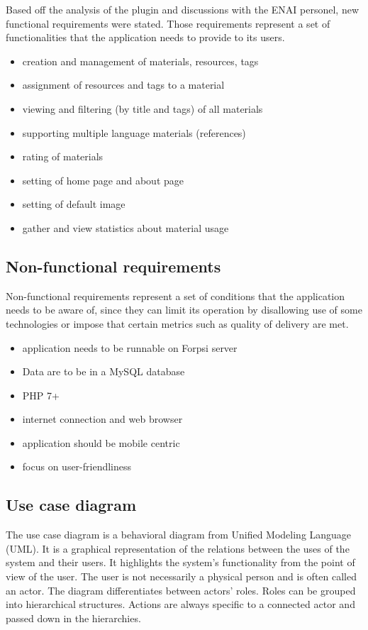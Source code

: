 \documentclass[
  digital,     %
  oneside,     %
  nosansbold,  %
  colorbold, %
  lof,         %
  lot,         %
]{fithesis4}
\begin{document}
Based off the analysis of the plugin and discussions with the ENAI personel, new functional requirements were stated. Those requirements represent a set of functionalities that the application needs to provide to its users.

\begin{itemize}
    \item creation and management of materials, resources, tags
    \item assignment of resources and tags to a material
    \item viewing and filtering (by title and tags) of all materials
    \item supporting multiple language materials (references)
    \item rating of materials
    \item setting of home page and about page
    \item setting of default image
    \item gather and view statistics about material usage
\end{itemize}

\subsection{Non-functional requirements}

Non-functional requirements represent a set of conditions that the application needs to be aware of, since they can limit its operation by disallowing use of some technologies or impose that certain metrics such as quality of delivery are met.

\begin{itemize}
	\item application needs to be runnable on Forpsi server~\cite{forpsi}
	\item Data are to be in a MySQL database
	\item PHP 7+
	\item internet connection and web browser
	\item application should be mobile centric
	\item focus on user-friendliness
\end{itemize}

\subsection{Use case diagram}

The use case diagram is a behavioral diagram from Unified Modeling Language (UML). It is a graphical representation of the relations between the uses of the system and their users. It highlights the system's functionality from the point of view of the user. The user is not necessarily a physical person and is often called an actor. The diagram differentiates between actors' roles. Roles can be grouped into hierarchical structures. Actions are always specific to a connected actor and passed down in the hierarchies.
\end{document}
